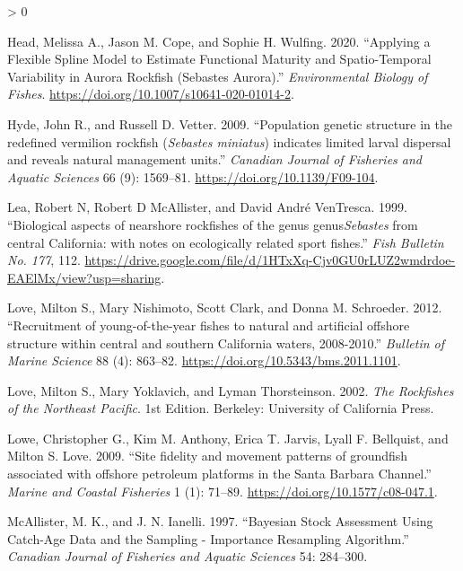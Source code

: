 \documentclass[11pt,
  english,
  a4paper,
]{article}
\newlength{\cslhangindent}
\newenvironment{CSLReferences}[2] %
 {%
  \setlength{\parindent}{0pt}
  \ifodd #1 \everypar{\setlength{\hangindent}{\cslhangindent}}\ignorespaces\fi
  \ifnum #2 > 0
  \setlength{\parskip}{#2\baselineskip}
  \fi
 }%
 {}
\begin{document}
\begin{CSLReferences}{1}{0}
\leavevmode\hypertarget{ref-head_fxnalmatspline_2020}{}%
Head, Melissa A., Jason M. Cope, and Sophie H. Wulfing. 2020. {``Applying a Flexible Spline Model to Estimate Functional Maturity and Spatio-Temporal Variability in Aurora Rockfish (Sebastes Aurora).''} \emph{Environmental Biology of Fishes}. \url{https://doi.org/10.1007/s10641-020-01014-2}.

\leavevmode\hypertarget{ref-Hyde2009}{}%
Hyde, John R., and Russell D. Vetter. 2009. {``{Population genetic structure in the redefined vermilion rockfish (\emph{Sebastes miniatus}) indicates limited larval dispersal and reveals natural management units}.''} \emph{Canadian Journal of Fisheries and Aquatic Sciences} 66 (9): 1569--81. \url{https://doi.org/10.1139/F09-104}.

\leavevmode\hypertarget{ref-Lea1999}{}%
Lea, Robert N, Robert D McAllister, and David André VenTresca. 1999. {``{Biological aspects of nearshore rockfishes of the genus genus\emph{Sebastes} from central California: with notes on ecologically related sport fishes}.''} \emph{Fish Bulletin No. 177}, 112. \url{https://drive.google.com/file/d/1HTxXq-Cjv0GU0rLUZ2wmdrdoe-EAElMx/view?usp=sharing}.

\leavevmode\hypertarget{ref-Love2012a}{}%
Love, Milton S., Mary Nishimoto, Scott Clark, and Donna M. Schroeder. 2012. {``{Recruitment of young-of-the-year fishes to natural and artificial offshore structure within central and southern California waters, 2008-2010}.''} \emph{Bulletin of Marine Science} 88 (4): 863--82. \url{https://doi.org/10.5343/bms.2011.1101}.

\leavevmode\hypertarget{ref-love_rockfishes_2002}{}%
Love, Milton S., Mary Yoklavich, and Lyman Thorsteinson. 2002. \emph{The Rockfishes of the Northeast Pacific}. 1st Edition. Berkeley: University of California Press.

\leavevmode\hypertarget{ref-Lowe2009}{}%
Lowe, Christopher G., Kim M. Anthony, Erica T. Jarvis, Lyall F. Bellquist, and Milton S. Love. 2009. {``{Site fidelity and movement patterns of groundfish associated with offshore petroleum platforms in the Santa Barbara Channel}.''} \emph{Marine and Coastal Fisheries} 1 (1): 71--89. \url{https://doi.org/10.1577/c08-047.1}.

\leavevmode\hypertarget{ref-mcallister_bayesian_1997}{}%
McAllister, M. K., and J. N. Ianelli. 1997. {``Bayesian Stock Assessment Using Catch-Age Data and the Sampling - Importance Resampling Algorithm.''} \emph{Canadian Journal of Fisheries and Aquatic Sciences} 54: 284--300.


\end{CSLReferences}
\end{document}
